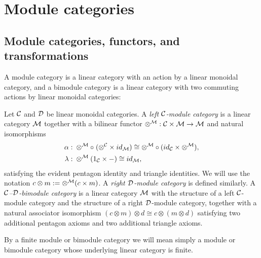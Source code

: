 \documentclass{amsart}
\begin{document}


\section{Module categories} \label{sec:tc-bimod}

\subsection{Module categories, functors, and transformations} 

A module category is a linear category with an action by a linear monoidal category, and a bimodule category is a linear category with two commuting actions by linear monoidal categories:
\begin{definition}
Let $\mathcal C$ and $\mathcal D$ be linear monoidal categories.
A \emph{left $\mathcal C$-module category} is a linear category $\mathcal M$ together with a bilinear functor $\otimes^{\mathcal M}: \mathcal C \times \mathcal M \to \mathcal M$ and natural isomorphisms
\begin{align*}
		\alpha: & \;    \otimes^{\mathcal M} \circ \; (\otimes^{\mathcal C} \times id_{\mathcal M}) \cong  \otimes^{\mathcal M} \circ (id_{\mathcal C} \times \otimes^{\mathcal M}), \\
		\lambda: & \; \otimes^{\mathcal M} (1_{\mathcal C} \times -) \cong id_{\mathcal M},
\end{align*}
satisfying the evident pentagon identity and triangle identities.  We will use the notation $c \otimes m := \otimes^\mathcal M(c \times m)$.  A \emph{right $\mathcal D$-module category} is defined similarly.  A \emph{$\mathcal C$--$\mathcal D$-bimodule category} is a linear category $\mathcal M$ with the structure of a left $\mathcal C$-module category and the structure of a right $\mathcal D$-module category, together with a natural associator isomorphism $(c \otimes m) \otimes d \cong c \otimes (m \otimes d)$ satisfying two additional pentagon axioms and two additional triangle axioms.  
\end{definition}
\nid By a finite module or bimodule category we will mean simply a module or bimodule category whose underlying linear category is finite. 
\end{document}
